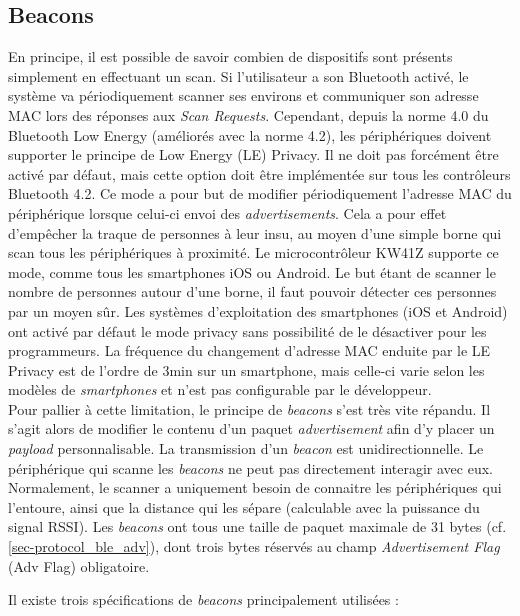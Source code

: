 \subsection{Beacons}
\label{sec-protocols_BLE_beacons}

En principe, il est possible de savoir combien de dispositifs sont présents simplement en effectuant un scan. Si l'utilisateur a son Bluetooth activé, le système va périodiquement scanner ses environs et communiquer son adresse MAC lors des réponses aux \textit{Scan Requests}. Cependant, depuis la norme 4.0 du Bluetooth Low Energy (améliorés avec la norme 4.2\cite{Bluetoot24:online}), les périphériques doivent supporter le principe de Low Energy (LE) Privacy\cite{Bluetoot24:online}. Il ne doit pas forcément être activé par défaut, mais cette option doit être implémentée sur tous les contrôleurs Bluetooth 4.2. Ce mode a pour but de modifier périodiquement l'adresse MAC du périphérique lorsque celui-ci envoi des \textit{advertisements}. Cela a pour effet d'empêcher la traque de personnes à leur insu, au moyen d'une simple borne qui scan tous les périphériques à proximité. Le microcontrôleur KW41Z supporte ce mode, comme tous les smartphones iOS ou Android. Le but étant de scanner le nombre de personnes autour d'une borne, il faut pouvoir détecter ces personnes par un moyen sûr. Les systèmes d'exploitation des smartphones (iOS et Android) ont activé par défaut le mode privacy sans possibilité de le désactiver pour les programmeurs. La fréquence du changement d'adresse MAC enduite par le LE Privacy est de l'ordre de 3min sur un smartphone, mais celle-ci varie selon les modèles de \textit{smartphones} et n'est pas configurable par le développeur. \\

Pour pallier à cette limitation, le principe de \textit{beacons} s'est très vite répandu. Il s'agit alors de modifier le contenu d'un paquet \textit{advertisement} afin d'y placer un \textit{payload} personnalisable. La transmission d'un \textit{beacon} est unidirectionnelle. Le périphérique qui scanne les \textit{beacons} ne peut pas directement interagir avec eux. Normalement, le scanner a uniquement besoin de connaitre les périphériques qui l'entoure, ainsi que la distance qui les sépare (calculable avec la puissance du signal RSSI). Les \textit{beacons} ont tous une taille de paquet maximale de 31 bytes (cf. \cref{sec-protocol_ble_adv}), dont trois bytes réservés au champ \textit{Advertisement Flag} (Adv Flag) obligatoire.

Il existe trois spécifications de \textit{beacons} principalement utilisées \cite{Understa87:online} : 

